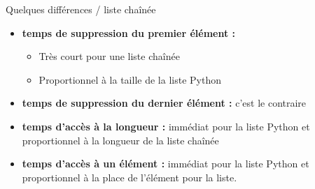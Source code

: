 \documentclass[10pt]{beamer}
\begin{document}
\begin{frame}[fragile]{Quelques différences  / liste chaînée}
\begin{itemize}
    \item \textbf{temps de suppression du premier élément :}  \begin{itemize}
        \item Très court pour une liste chaînée
        \item Proportionnel à la taille de la liste Python
    \end{itemize}
    \item \textbf{temps de suppression du dernier élément :}  c'est le contraire
    \item \textbf{temps d'accès à la longueur :} immédiat pour la liste Python et proportionnel à la longueur de la liste chaînée
    \item \textbf{temps d'accès à un élément :} immédiat pour la liste Python et proportionnel à la place de l'élément pour la liste.
\end{itemize}
\end{frame}
\end{document}
